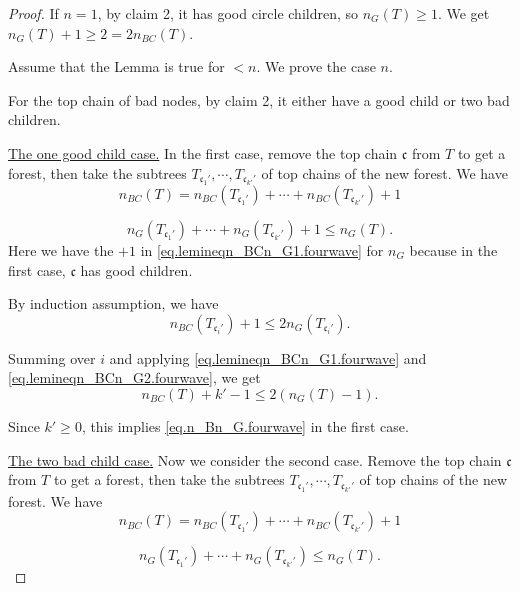 \begin{proof}
If $n=1$, by claim 2, it has good circle children, so $n_{G}(T)\ge 1$. We get $n_{G}(T)+1\ge 2 =2n_{BC}(T) $.

Assume that the Lemma is true for $<n$. We prove the case $n$. 


For the top chain of bad nodes, by claim 2, it either have a good child or two bad children.

\underline{The one good child case.} In the first case, remove the top chain $\mathfrak{c}$ from $T$ to get a forest, then take the subtrees $T_{\mathfrak{c}_1'},\cdots, T_{\mathfrak{c}_{k'}'}$ of top chains of the new forest. We have 
\begin{equation}\label{eq.lemineqn_BCn_G1.fourwave}
 n_{BC}(T) = n_{BC}(T_{\mathfrak{c}_1'}) + \cdots + n_{BC}(T_{\mathfrak{c}_{k'}'}) + 1
\end{equation}

\begin{equation}\label{eq.lemineqn_BCn_G2.fourwave}
 n_{G}(T_{\mathfrak{c}_1'}) + \cdots + n_{G}(T_{\mathfrak{c}_{k'}'}) + 1\le n_{G}(T).
\end{equation}
Here we have the $+1$ in \eqref{eq.lemineqn_BCn_G1.fourwave} for $n_{G}$ because in the first case, $\mathfrak{c}$ has good children.

By induction assumption, we have
\begin{equation}
 n_{BC}(T_{\mathfrak{c}_i'}) + 1 \le 2n_{G}(T_{\mathfrak{c}_i'}).
\end{equation}

Summing over $i$ and applying \eqref{eq.lemineqn_BCn_G1.fourwave} and \eqref{eq.lemineqn_BCn_G2.fourwave}, we get 
\begin{equation}
 n_{BC}(T) + k'-1 \le 2(n_{G}(T)-1).
\end{equation}

Since $k'\ge 0$, this implies \eqref{eq.n_Bn_G.fourwave} in the first case.

\underline{The two bad child case.} Now we consider the second case. Remove the top chain $\mathfrak{c}$ from $T$ to get a forest, then take the subtrees $T_{\mathfrak{c}_1'},\cdots, T_{\mathfrak{c}_{k'}'}$ of top chains of the new forest. We have 
\begin{equation}\label{eq.lemineqn_BCn_G3.fourwave}
 n_{BC}(T) = n_{BC}(T_{\mathfrak{c}_1'}) + \cdots + n_{BC}(T_{\mathfrak{c}_{k'}'}) + 1
\end{equation}

\begin{equation}\label{eq.lemineqn_BCn_G4.fourwave}
 n_{G}(T_{\mathfrak{c}_1'}) + \cdots + n_{G}(T_{\mathfrak{c}_{k'}'})\le n_{G}(T).
\end{equation}


\end{proof}

